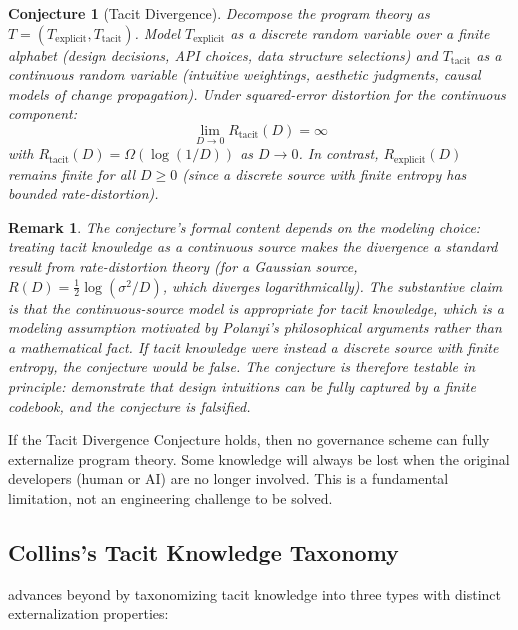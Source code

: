 \documentclass[11pt, a4paper, logo, copyright]{googledeepmind}
\newtheorem{conjecture}{Conjecture}[section]
\newtheorem*{remark}{Remark}
\begin{document}
\begin{conjecture}[Tacit Divergence]
\label{conj:tacit}
Decompose the program theory as $T = (T_{\mathrm{explicit}}, T_{\mathrm{tacit}})$. Model $T_{\mathrm{explicit}}$ as a discrete random variable over a finite alphabet (design decisions, API choices, data structure selections) and $T_{\mathrm{tacit}}$ as a continuous random variable (intuitive weightings, aesthetic judgments, causal models of change propagation). Under squared-error distortion for the continuous component:
\begin{equation}
    \lim_{D \to 0} R_{\mathrm{tacit}}(D) = \infty
\end{equation}
with $R_{\mathrm{tacit}}(D) = \Omega(\log(1/D))$ as $D \to 0$. In contrast, $R_{\mathrm{explicit}}(D)$ remains finite for all $D \geq 0$ (since a discrete source with finite entropy has bounded rate-distortion).
\end{conjecture}

\begin{remark}
The conjecture's formal content depends on the modeling choice: treating tacit knowledge as a continuous source makes the divergence a standard result from rate-distortion theory (for a Gaussian source, $R(D) = \frac{1}{2}\log(\sigma^2/D)$, which diverges logarithmically). The substantive claim is that the continuous-source model is appropriate for tacit knowledge, which is a modeling assumption motivated by Polanyi's philosophical arguments rather than a mathematical fact. If tacit knowledge were instead a discrete source with finite entropy, the conjecture would be false. The conjecture is therefore testable in principle: demonstrate that design intuitions can be fully captured by a finite codebook, and the conjecture is falsified.
\end{remark}

If the Tacit Divergence Conjecture holds, then no governance scheme can fully externalize program theory. Some knowledge will always be lost when the original developers (human or AI) are no longer involved. This is a fundamental limitation, not an engineering challenge to be solved.

\subsection{Collins's Tacit Knowledge Taxonomy}

\citet{collins2010} advances beyond \citet{polanyi1966} by taxonomizing tacit knowledge into three types with distinct externalization properties:
\end{document}
